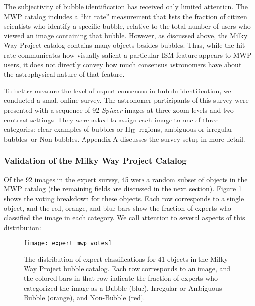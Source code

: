 \documentclass[preprint]{aastex}
\newcommand{\hii}[0]{H$_{\rm II}$}
\begin{document}
The subjectivity of bubble identification has received only limited attention. The MWP catalog includes a ``hit rate'' measurement that lists the fraction of citizen scientists who identify a specific bubble, relative to the total number of users who viewed an image containing that bubble. However, as discussed above, the Milky Way Project catalog contains many objects besides bubbles. Thus, while the hit rate communicates how visually salient a particular ISM feature appears to MWP users, it does not directly convey how much consensus astronomers have about the astrophysical nature of that feature.

To better measure the level of expert consensus in bubble identification, we conducted a small online survey. The astronomer participants of this survey were presented with a sequence of 92 \emph{Spitzer} images at three zoom levels and two contrast settings. They were asked to assign each image to one of three categories: clear examples of bubbles or \hii\, regions, ambiguous or irregular bubbles, or Non-bubbles. Appendix A discusses the survey setup in more detail.

\subsubsection{Validation of the Milky Way Project Catalog}
\label{sec:expert_mwp}
Of the 92 images in the expert survey, 45 were a random subset of objects in the MWP catalog (the remaining fields are discussed in the next section). Figure \ref{fig:expert_mwp_votes} shows the voting breakdown for these objects. Each row corresponds to a single object, and the red, orange, and blue bars show the fraction of experts who classified the image in each category.  We call attention to several aspects of this distribution: 


\begin{figure}[h!]
\texttt{[image: expert\_mwp\_votes]}
\caption{The distribution of expert classifications for 41 objects in the Milky Way Project bubble catalog. Each row corresponds to an image, and the colored bars in that row indicate the fraction of experts who categorized the image as a Bubble (blue), Irregular or Ambiguous Bubble (orange), and Non-Bubble (red).}
\label{fig:expert_mwp_votes}
\end{figure}
\end{document}

